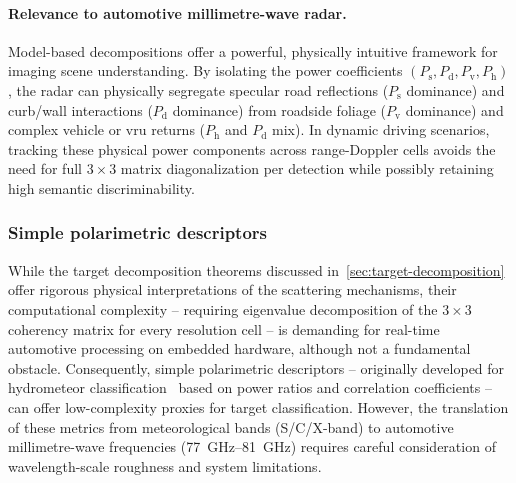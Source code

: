 \paragraph{Relevance to automotive millimetre-wave radar.}
Model-based decompositions offer a powerful, physically intuitive framework for imaging scene understanding.
By isolating the power coefficients $(P_{\mathrm{s}}, P_{\mathrm{d}}, P_{\mathrm{v}}, P_{\mathrm{h}})$, the radar can physically segregate specular road reflections ($P_{\mathrm{s}}$ dominance) and curb/wall interactions ($P_{\mathrm{d}}$ dominance) from roadside foliage ($P_{\mathrm{v}}$ dominance) and complex vehicle or \gls{vru} returns ($P_{\mathrm{h}}$ and $P_{\mathrm{d}}$ mix).
In dynamic driving scenarios, tracking these physical power components across range-Doppler cells avoids the need for full $3 \times 3$ matrix diagonalization per detection while possibly retaining high semantic discriminability.


\subsubsection{Simple polarimetric descriptors}
\label{sec:simple-polarimetric-descriptors}

While the target decomposition theorems discussed in~\cref{sec:target-decomposition} offer rigorous physical interpretations of the scattering mechanisms, their computational complexity -- requiring eigenvalue decomposition of the $3\times3$ coherency matrix for every resolution cell -- is demanding for real-time automotive processing on embedded hardware, although not a fundamental obstacle.
Consequently, simple polarimetric descriptors -- originally developed for hydrometeor classification~\parencite{bringiPolarimetricDopplerWeather2001} based on power ratios and correlation coefficients -- can offer low-complexity proxies for target classification.
However, the translation of these metrics from meteorological bands (S/C/X-band) to automotive millimetre-wave frequencies (\qtyrange{77}{81}{GHz}) requires careful consideration of wavelength-scale roughness and system limitations.

